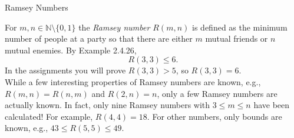 \documentclass[smaller,hyperref={CJKbookmarks=true}]{beamer}
\newcommand{\N}{\mathbb{N}} \newcommand{\Z}{\mathbb{Z}} \newcommand{\Q}{\mathbb{Q}}
\begin{document}
\begin{frame}[c,label=386]{Ramsey Numbers}
\begin{spacing}{1.1}
For $m,n\in\N\setminus\{0,1\}$ the \emph{Ramsey number $R(m,n)$} is defined as the
minimum number of people at a party so that there are either $m$ mutual
friends or $n$ mutual enemies. By Example 2.4.26,
\[R(3,3)\leq 6.\]
In the assignments you will prove $R(3,3)>5$, so $R(3,3)=6$.\\[6pt]
While a few interesting properties of Ramsey numbers are known, e.g., $R(m,n)=R(n,m)$ and $R(2,n)=n$, only a few Ramsey numbers are actually known. In fact, only nine Ramsey numbers with $3\leq m\leq n$ have been calculated! For example, $R(4,4)=18$. For other numbers, only bounds are known, e.g., $43\leq R(5,5)\leq 49$.
\end{spacing}
\end{frame}
\end{document}
